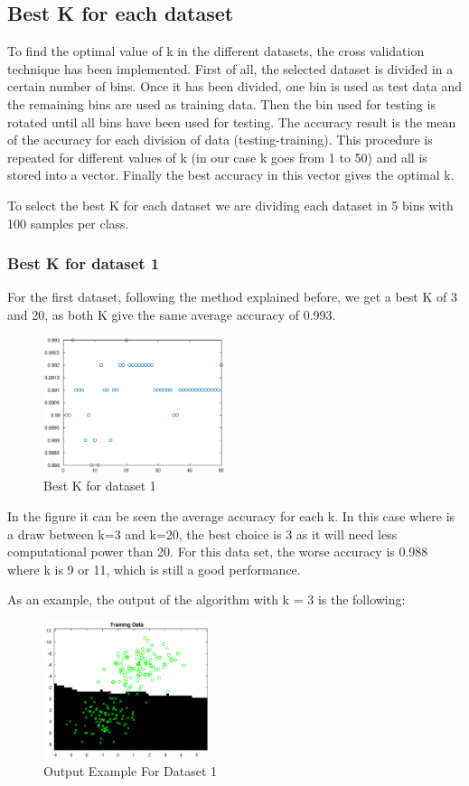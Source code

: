 \documentclass{article}
\begin{document}
\subsection{Best K for each dataset}
To find the optimal value of k in the different datasets, the cross validation technique has been implemented. First of all, the selected dataset is divided in a certain number of bins. Once it has been divided, one bin is used as test data and the remaining bins are used as training data. Then the bin used for testing is rotated until all bins have been used for testing. The accuracy result is the mean of the accuracy for each division of data (testing-training). This procedure is repeated for different values of k (in our case k goes from 1 to 50) and all is stored into a vector. Finally the best accuracy in this vector gives the optimal k.

To select the best K for each dataset we are dividing each dataset in 5 bins with 100 samples per class. 

\subsubsection {Best K for dataset 1}
For the first dataset, following the method explained before, we get a best K of 3 and 20, as both K give the same average accuracy of 0.993.

\begin{figure}[!htb]
\centering
\includegraphics[height=4cm]{images/bestkdataset1}
\caption{Best K for dataset 1}
\label{fig:bestkdataset1}
\end{figure}

In the figure it can be seen the average accuracy for each k. In this case where is a draw between k=3 and k=20, the best choice is 3 as it will need less computational power than 20. For this data set, the worse accuracy is 0.988 where k is 9 or 11, which is still a good performance.

As an example, the output of the algorithm with k = 3 is the following:

\begin{figure}[!htb]
\centering
\includegraphics[height=4cm]{images/resultsknn1}
\caption{Output Example For Dataset 1}
\label{fig:resultsknn1}
\end{figure}
\end{document}
